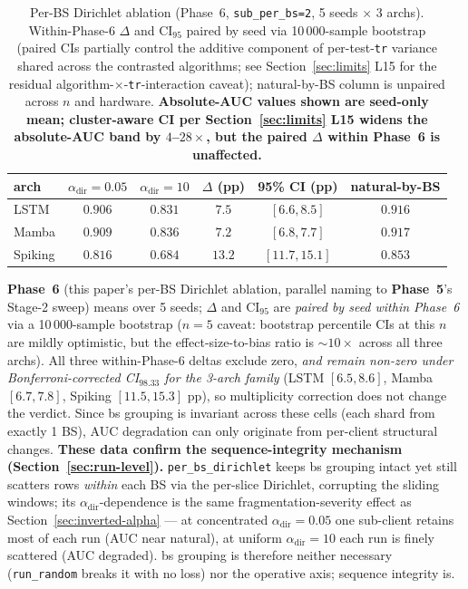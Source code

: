 \documentclass[journal]{IEEEtran}
\newcommand{\alphadir}{\ensuremath{\alpha_{\mathrm{dir}}}}
\begin{document}
\begin{table}[t]
\caption{Per-BS Dirichlet ablation (Phase~6, \lstinline|sub_per_bs=2|, 5 seeds $\times$ 3 archs). Within-Phase-6 $\Delta$ and CI$_{95}$ paired by seed via 10\,000-sample bootstrap (paired CIs partially control the additive component of per-test-\lstinline|tr| variance shared across the contrasted algorithms; see Section~\ref{sec:limits} L15 for the residual algorithm-$\times$-\lstinline|tr|-interaction caveat); natural-by-BS column is unpaired across $n$ and hardware. \textbf{Absolute-AUC values shown are seed-only mean; cluster-aware CI per Section~\ref{sec:limits} L15 widens the absolute-AUC band by $4$--$28\times$, but the paired $\Delta$ within Phase~6 is unaffected.}}
\label{tab:per-bs-dirichlet}
\centering
\begin{tabular}{@{}lccccc@{}}
\toprule
arch    & $\alphadir = 0.05$ & $\alphadir = 10$ & $\Delta$ (pp) & 95\% CI (pp) & natural-by-BS \\
\midrule
LSTM    & $0.906$ & $0.831$ & $7.5$  & $[6.6, 8.5]$    & $0.916$ \\
Mamba   & $0.909$ & $0.836$ & $7.2$  & $[6.8, 7.7]$    & $0.917$ \\
Spiking & $0.816$ & $0.684$ & $13.2$ & $[11.7, 15.1]$  & $0.853$ \\
\bottomrule
\end{tabular}
\end{table}

\textbf{Phase~6} (this paper's per-BS Dirichlet ablation, parallel naming to \textbf{Phase~5}'s Stage-2 sweep) means over 5 seeds; $\Delta$ and CI$_{95}$ are \emph{paired by seed within Phase~6} via a 10\,000-sample bootstrap ($n = 5$ caveat: bootstrap percentile CIs at this $n$ are mildly optimistic, but the effect-size-to-bias ratio is $\sim 10\times$ across all three archs). All three within-Phase-6 deltas exclude zero, \emph{and remain non-zero under Bonferroni-corrected CI$_{98.33}$ for the 3-arch family} (LSTM $[6.5, 8.6]$, Mamba $[6.7, 7.8]$, Spiking $[11.5, 15.3]$ pp), so multiplicity correction does not change the verdict. Since bs grouping is invariant across these cells (each shard from exactly 1 BS), AUC degradation can only originate from per-client structural changes. \textbf{These data confirm the sequence-integrity mechanism (Section~\ref{sec:run-level}).} \lstinline|per_bs_dirichlet| keeps bs grouping intact yet still scatters rows \emph{within} each BS via the per-slice Dirichlet, corrupting the sliding windows; its $\alphadir$-dependence is the same fragmentation-severity effect as Section~\ref{sec:inverted-alpha} --- at concentrated $\alphadir = 0.05$ one sub-client retains most of each run (AUC near natural), at uniform $\alphadir = 10$ each run is finely scattered (AUC degraded). bs grouping is therefore neither necessary (\lstinline|run_random| breaks it with no loss) nor the operative axis; sequence integrity is.
\end{document}
